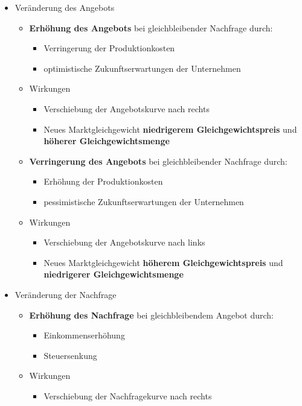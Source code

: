 \begin{itemize}
\setlength\itemsep{0em}
	\item Veränderung des Angebots
	\begin{itemize}
		\item {\bf Erhöhung des Angebots} bei gleichbleibender Nachfrage durch:
		\begin{itemize}
			\item Verringerung der Produktionkosten
			\item optimistische Zukunftserwartungen der Unternehmen
		\end{itemize}
		\item Wirkungen
		\begin{itemize}
			\item Verschiebung der Angebotskurve nach rechts
			\item Neues Marktgleichgewicht {\bf niedrigerem Gleichgewichtspreis} und {\bf höherer Gleichgewichtsmenge}
		\end{itemize}
		\item {\bf Verringerung des Angebots} bei gleichbleibender Nachfrage durch:
		\begin{itemize}
			\item Erhöhung der Produktionkosten
			\item pessimistische Zukunftserwartungen der Unternehmen
		\end{itemize}
		\item Wirkungen
		\begin{itemize}
			\item Verschiebung der Angebotskurve nach links
			\item Neues Marktgleichgewicht {\bf höherem Gleichgewichtspreis} und {\bf niedrigerer Gleichgewichtsmenge}
		\end{itemize}
	\end{itemize}
	\item Veränderung der Nachfrage
	\begin{itemize}
		\item {\bf Erhöhung des Nachfrage} bei gleichbleibendem Angebot durch:
		\begin{itemize}
			\item Einkommenserhöhung
			\item Steuersenkung
		\end{itemize}
		\item Wirkungen
		\begin{itemize}
			\item Verschiebung der Nachfragekurve nach rechts

\end{itemize}
\end{itemize}
\end{itemize}

